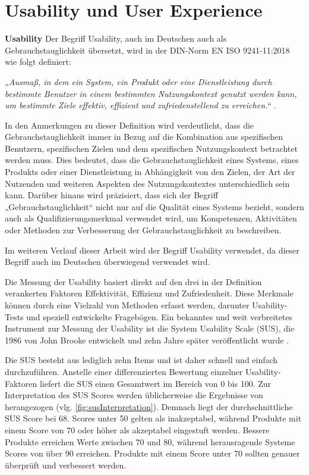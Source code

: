 \section{Usability und User Experience}

\textbf{Usability}
Der Begriff Usability, auch im Deutschen auch als Gebrauchstauglichkeit übersetzt, wird in der DIN-Norm EN ISO 9241-11:2018 wie folgt definiert:

\textit{„Ausmaß, in dem ein System, ein Produkt oder eine Dienstleistung durch bestimmte Benutzer in einem bestimmten Nutzungskontext genutzt werden kann, um bestimmte Ziele effektiv, effizient und zufriedenstellend zu erreichen.“ \cite{DINISO9241-11}.}

In den Anmerkungen zu dieser Definition wird verdeutlicht, dass die Gebrauchstauglichkeit immer in Bezug auf die Kombination aus spezifischen Benutzern, spezifischen Zielen und dem spezifischen Nutzungskontext betrachtet werden muss. Dies bedeutet, dass die Gebrauchstauglichkeit eines Systems, eines Produkts oder einer Dienstleistung in Abhängigkeit von den Zielen, der Art der Nutzenden und weiteren Aspekten des Nutzungskontextes unterschiedlich sein kann. Darüber hinaus wird präzisiert, dass sich der Begriff „Gebrauchstauglichkeit“ nicht nur auf die Qualität eines Systems bezieht, sondern auch als Qualifizierungsmerkmal verwendet wird, um Kompetenzen, Aktivitäten oder Methoden zur Verbesserung der Gebrauchstauglichkeit zu beschreiben. 

Im weiteren Verlauf dieser Arbeit wird der Begriff Usability verwendet, da dieser Begriff auch im Deutschen überwiegend verwendet wird. 

Die Messung der Usability basiert direkt auf den drei in der Definition verankerten Faktoren Effektivität, Effizienz und Zufriedenheit. Diese Merkmale können durch eine Vielzahl von Methoden erfasst werden, darunter Usability-Tests und speziell entwickelte Fragebögen. Ein bekanntes und weit verbreitetes Instrument zur Messung der Usability ist die System Usability Scale (SUS), die 1986 von John Brooke entwickelt und zehn Jahre später veröffentlicht wurde \citep{brooke_sus_1996}.

Die SUS besteht aus lediglich zehn Items und ist daher schnell und einfach durchzuführen. Anstelle einer differenzierten Bewertung einzelner Usability-Faktoren liefert die SUS einen Gesamtwert im Bereich von 0 bis 100. Zur Interpretation des SUS Scores werden üblicherweise die Ergebnisse von \citet{bangor_empirical_2008} herangezogen (vlg. \autoref{fig:susInterpretation}). Demnach liegt der durchschnittliche SUS Score bei 68. Scores unter 50 gelten als inakzeptabel, während Produkte mit einem Score von 70 oder höher als akzeptabel eingestuft werden. Bessere Produkte erreichen Werte zwischen 70 und 80, während herausragende Systeme Scores von über 90 erreichen. Produkte mit einem Score unter 70 sollten genauer überprüft und verbessert werden. 

